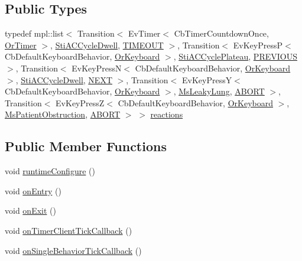 \subsection*{Public Types}
\begin{DoxyCompactItemize}
\item 
typedef mpl\+::list$<$ Transition$<$ Ev\+Timer$<$ Cb\+Timer\+Countdown\+Once, \hyperlink{classsm__respira__1_1_1OrTimer}{Or\+Timer} $>$, \hyperlink{structsm__respira__1_1_1ac__cycle__inner__states_1_1StiACCycleDwell}{Sti\+A\+C\+Cycle\+Dwell}, \hyperlink{structsm__respira__1_1_1ac__cycle__inner__states_1_1StiACCycleExpire_1_1TIMEOUT}{T\+I\+M\+E\+O\+UT} $>$, Transition$<$ Ev\+Key\+PressP$<$ Cb\+Default\+Keyboard\+Behavior, \hyperlink{classsm__respira__1_1_1OrKeyboard}{Or\+Keyboard} $>$, \hyperlink{structsm__respira__1_1_1ac__cycle__inner__states_1_1StiACCyclePlateau}{Sti\+A\+C\+Cycle\+Plateau}, \hyperlink{structsm__respira__1_1_1ac__cycle__inner__states_1_1StiACCycleExpire_1_1PREVIOUS}{P\+R\+E\+V\+I\+O\+US} $>$, Transition$<$ Ev\+Key\+PressN$<$ Cb\+Default\+Keyboard\+Behavior, \hyperlink{classsm__respira__1_1_1OrKeyboard}{Or\+Keyboard} $>$, \hyperlink{structsm__respira__1_1_1ac__cycle__inner__states_1_1StiACCycleDwell}{Sti\+A\+C\+Cycle\+Dwell}, \hyperlink{structsm__respira__1_1_1ac__cycle__inner__states_1_1StiACCycleExpire_1_1NEXT}{N\+E\+XT} $>$, Transition$<$ Ev\+Key\+PressY$<$ Cb\+Default\+Keyboard\+Behavior, \hyperlink{classsm__respira__1_1_1OrKeyboard}{Or\+Keyboard} $>$, \hyperlink{classsm__respira__1_1_1MsLeakyLung}{Ms\+Leaky\+Lung}, \hyperlink{classABORT}{A\+B\+O\+RT} $>$, Transition$<$ Ev\+Key\+PressZ$<$ Cb\+Default\+Keyboard\+Behavior, \hyperlink{classsm__respira__1_1_1OrKeyboard}{Or\+Keyboard} $>$, \hyperlink{classsm__respira__1_1_1MsPatientObstruction}{Ms\+Patient\+Obstruction}, \hyperlink{classABORT}{A\+B\+O\+RT} $>$ $>$ \hyperlink{structsm__respira__1_1_1ac__cycle__inner__states_1_1StiACCycleExpire_aed9b816dca6a2dfa6500c2e4678d3784}{reactions}
\end{DoxyCompactItemize}
\subsection*{Public Member Functions}
\begin{DoxyCompactItemize}
\item 
void \hyperlink{structsm__respira__1_1_1ac__cycle__inner__states_1_1StiACCycleExpire_a53776f163d9983ec3d4104b858d77eb0}{runtime\+Configure} ()
\item 
void \hyperlink{structsm__respira__1_1_1ac__cycle__inner__states_1_1StiACCycleExpire_a00fafff2c0aaa6195ffbad563c09e9b2}{on\+Entry} ()
\item 
void \hyperlink{structsm__respira__1_1_1ac__cycle__inner__states_1_1StiACCycleExpire_a5eba0206dc4ba420b668c01b9f3ddb3a}{on\+Exit} ()
\item 
void \hyperlink{structsm__respira__1_1_1ac__cycle__inner__states_1_1StiACCycleExpire_a9f01d2f0b1003702adfb6dbac0a75e8d}{on\+Timer\+Client\+Tick\+Callback} ()
\item 
void \hyperlink{structsm__respira__1_1_1ac__cycle__inner__states_1_1StiACCycleExpire_abf27619c790ae390ba117175408dff54}{on\+Single\+Behavior\+Tick\+Callback} ()
\end{DoxyCompactItemize}
